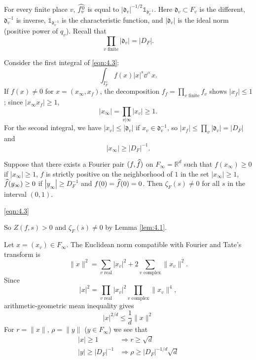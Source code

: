 For every finite place $v$, $\widehat{f_v^0}$ is equal to $|\mathfrak{d}_v|^{-1/2} \mathds{1}_{\mathfrak{d}_{v}^{-1}}$.
Here $\mathfrak{d}_v \subset F_v$ is the different, $\mathfrak{d}_v^{-1}$ is inverse, $\mathds{1}_{\mathfrak{d}_v^{-1}}$ is the characteristic function, and $|\mathfrak{d}_v|$ is the ideal norm (positive power of $q_v$).
Recall that
\[
    \prod_{v\text{ finite}} |\mathfrak{d}_v| = |D_F|.
\]

Consider the first integral of \eqref{eqn:4.3}:
\begin{equation}
\label{eqn:4.4}
    \int_{I_F^+} f(x) |x|^{s} \dd^\times x.
\end{equation}
If $f(x) \neq 0$ for $x = (x_\infty, x_f)$, the decomposition $f_f = \prod_{v\text{ finite}}f_v$ shows $|x_f| \leq 1$; since $|x_\infty x_f| \geq 1$,
\begin{equation}
\label{eqn:4.5}
    |x_\infty| = \prod_{v | \infty} |x_v| \geq 1.
\end{equation}
For the second integral, we have $|x_v| \leq |\mathfrak{d}_v|$ if $x_v \in \mathfrak{d}_v^{-1}$, so $|x_f| \leq \prod_v |\mathfrak{d}_v| = |D_F|$ and
\begin{equation}
\label{eqn:4.6}
    |x_\infty| \geq |D_F|^{-1}.
\end{equation}

\begin{lemma}
\label{lem:4.2}
Suppose that there exists a Fourier pair $(f, \widehat{f})$ on $F_\infty = \mathbb{R}^{d}$ such that $f(x_\infty) \geq 0$ if $|x_\infty| \geq 1$, $f$ is strictly positive on the neighborhood of $1$ in the set $|x_\infty| \geq 1$, $\widehat{f}(y_\infty) \geq 0$ if $|y_\infty| \geq D_F^{-1}$ and $f(0) = \widehat{f}(0) = 0$.
Then $\zeta_F(s) \neq 0$ for all $s$ in the interval $(0, 1)$.
\end{lemma}

\eqref{eqn:4.3}

So $Z(f, s) > 0$ and $\zeta_F(s) \neq 0$ by Lemma \ref{lem:4.1}.

Let $x = (x_v) \in F_\infty$.
The Euclidean norm compatible with Fourier and Tate's transform is
\[
    \|x\|^{2} = \sum_{v\text{ real}} |x_v|^2 + 2 \sum_{v\text{ complex}} \|x_v\|^2.
\]
Since
\[
    |x|^{2} = \prod_{v\text{ real}} |x_v|^{2} \prod_{v\text{ complex}} \|x_v\|^{4},
\]
arithmetic-geometric mean inequality gives
\[
    |x|^{2/d} \leq \frac{1}{d}\|x\|^{2}
\]
For $r = \|x\|$, $\rho = \|y\|$ ($y \in F_\infty$) we see that
\begin{align*}
    |x| \geq 1 &\Rightarrow r \geq \sqrt{d} \\
    |y| \geq |D_F|^{-1} &\Rightarrow \rho \geq |D_F|^{-1/d} \sqrt{d}
\end{align*}

